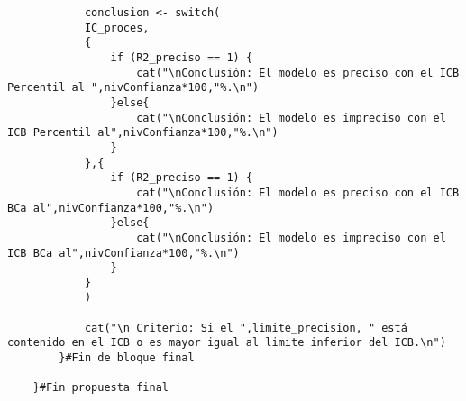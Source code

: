 \begin{verbatim}
			conclusion <- switch(
			IC_proces,
			{
				if (R2_preciso == 1) {
					cat("\nConclusión: El modelo es preciso con el ICB Percentil al ",nivConfianza*100,"%.\n")   
				}else{
					cat("\nConclusión: El modelo es impreciso con el ICB Percentil al",nivConfianza*100,"%.\n")
				}
			},{
				if (R2_preciso == 1) {
					cat("\nConclusión: El modelo es preciso con el ICB BCa al",nivConfianza*100,"%.\n")   
				}else{
					cat("\nConclusión: El modelo es impreciso con el ICB BCa al",nivConfianza*100,"%.\n")
				}
			}
			)
			
			cat("\n Criterio: Si el ",limite_precision, " está contenido en el ICB o es mayor igual al limite inferior del ICB.\n")
		}#Fin de bloque final
		
	}#Fin propuesta final
	
	
\end{verbatim}